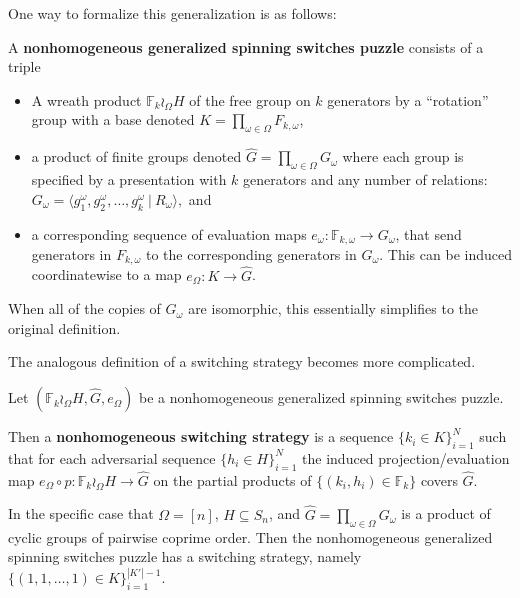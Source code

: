 One way to formalize this generalization is as follows:
\begin{definition}
  A \textbf{nonhomogeneous generalized spinning switches puzzle}
  consists of a triple \begin{itemize}
    \item A wreath product \(
      \mathbb F_k \wr_\Omega H
    \) of the free group on $k$ generators by a ``rotation'' group
    with a base denoted \(K = \prod_{\omega \in \Omega} F_{k, \omega}\),
    \item a product of finite groups denoted
    $\hat G = \prod_{\omega \in \Omega} G_\omega$ where each group is specified
    by a presentation with $k$ generators and any number of relations:
    \({
      G_\omega = \langle g^\omega_1, g^\omega_2, \dots, g^\omega_k\ |\ R_\omega\rangle,
    }\) and
    \item a corresponding sequence of evaluation maps
    $e_\omega \colon \mathbb F_{k,\omega} \rightarrow G_\omega$,
    that send generators in $F_{k,\omega}$ to the corresponding generators in
    $G_\omega$. This can be induced coordinatewise to a map
    $e_\Omega \colon K \rightarrow \hat{G}$.
  \end{itemize}
\end{definition}

When all of the copies of $G_\omega$ are isomorphic, this essentially simplifies
to the original definition.

The analogous definition of a switching strategy becomes more complicated.

\begin{definition}
  Let $(\mathbb F_k \wr_\Omega H, \hat{G}, e_\Omega)$ be a nonhomogeneous
  generalized spinning switches puzzle.

  Then a \textbf{nonhomogeneous switching strategy} is a sequence
  $\{k_i \in K\}_{i=1}^{N}$
  such that for each adversarial sequence ${\{h_i \in H\}_{i=1}^{N}}$
  the induced projection/evaluation map
  $e_\Omega \circ p \colon \mathbb F_k \wr_\Omega H \rightarrow \hat{G}$
  on the partial products of $\{(k_i, h_i) \in \mathbb F_k\}$
  covers $\hat{G}$.
\end{definition}

\begin{proposition}
  In the specific case that $\Omega = [n]$, $H \subseteq S_n$, and
  $\hat{G} = \prod_{\omega \in \Omega} G_\omega$ is a product of cyclic groups of
  pairwise coprime order.
  Then the nonhomogeneous generalized spinning switches puzzle has a switching
  strategy, namely $\{(1,1,\dots,1) \in K\}_{i = 1}^{|K'| - 1}$.
\end{proposition}


